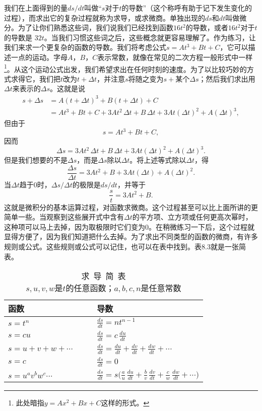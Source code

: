 我们在上面得到的量$ds/dt$叫做“$s$对于$t$的导数”（这个称呼有助于记下发生变化的过程），而求出它的复杂过程就称为求导，或求微商。单独出现的$ds$和$dt$叫做微分。为了让你们熟悉这些词，我们说我们已经找到函数$16t^2$的导数，或者$16t^2$对于$t$的导数是 $32t$。当我们习惯这些词之后，这些概念就更容易理解了。作为练习，让我们来求一个更复杂的函数的导数。我们将考虑公式$s=At^3+Bt+C$，它可以描述一点的运动。字母$A$，$B$，$C$表示常数，就像在常见的二次方程一般形式中一样\footnote{此处暗指$y=Ax^2+Bx+C$这样的形式。}。从这个运动公式出发，我们希望求出在任何时刻的速度。为了以比较巧妙的方式求得它，我们把$t$改为$t+\Delta t$，并注意$s$将随之变为$s+\textrm{某个}\Delta s$；然后我们求出用$\Delta t$来表示的$\Delta s$。这就是说
\begin{align*}
s+\Delta s&=A(t+\Delta t)^3+B(t+\Delta t)+C\\[1ex]
&=At^3+Bt+C+3At^2\,\Delta t+B\,\Delta t+3At(\Delta t)^2+
A(\Delta t)^3,
\end{align*}
但由于
\begin{equation*}
s=At^3+Bt+C,
\end{equation*}
因而
\begin{equation*}
\Delta s=3At^2\,\Delta t+B\,\Delta t+3At(\Delta t)^2+A(\Delta t)^3.
\end{equation*}
但是我们想要的不是$\Delta s$，而是$\Delta s$除以$\Delta t$。将上述等式除以$\Delta t$，得
\begin{equation*}
\frac{\Delta s}{\Delta t}=3At^2+B+3At(\Delta t)+A(\Delta t)^2.
\end{equation*}
当$\Delta t$趋于0时，$\Delta s/\Delta t$的极限是$ds/dt$，并等于
\begin{equation*}
\frac{s}{t}=3At^2+B.
\end{equation*}
这就是微积分的基本运算过程，对函数求微商。这个过程甚至可以比上面所讲的更简单一些。当观察到这些展开式中含有$\Delta t$的平方项、立方项或任何更高次幂时，这种项可以马上去掉，因为取极限时它们变为0。在稍微练习一下后，这个过程就显得方便了，因为我们知道把什么去掉。为了求出不同类型的函数的微商，有许多规则或公式。这些规则或公式可以记住，也可以在表中找到。表8.3就是一张简表。
\begin{table}[H]
\renewcommand{\arraystretch}{1.5}
\centering
\label{tab:求导简表}
\caption{求~导~简~表 \\{\footnotesize $s, u, v, w$是$t$的任意函数；$a, b, c, n$是任意常数}}
\medskip 
\begin{tabular}{@{}ll@{}}
\toprule
函数 & 导数  \\ \midrule
$s=t^n$  & $\frac{ds}{dt}=nt^{n-1}$  \\
$s=cu$  & $\frac{ds}{dt}=c\,\frac{du}{dt}$ \\
$s=u+v+w+\dotsb\qquad $ & $ \frac{ds}{dt}=\frac{du}{dt}+\frac{dv}{dt}+\frac{dw}{dt}+\dotsb$  \\
$s=c$ & $\frac{ds}{dt}=0 $ \\
$s=u^av^bw^c\dotsm$ & $\frac{ds}{dt}=s\biggl(\frac{a}{u}\,\frac{du}{dt}+
\frac{b}{v}\,\frac{dv}{dt}+\frac{c}{w}\,\frac{dw}{dt}+\dotsb\biggr)$
 \\ \bottomrule
\end{tabular}
\end{table}




